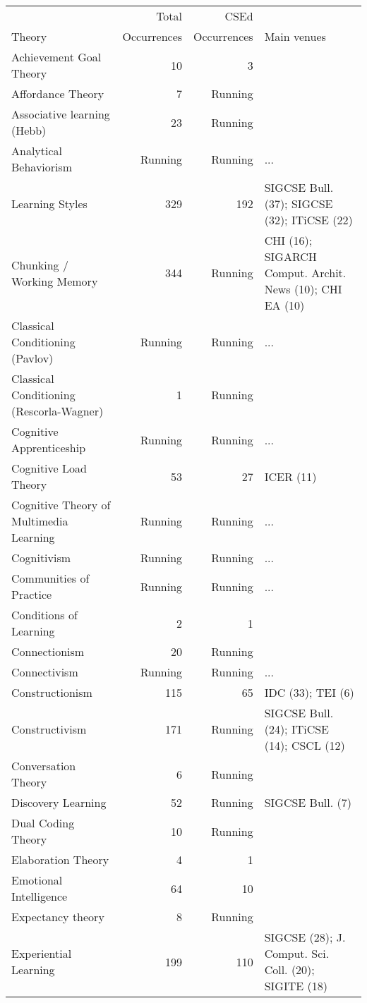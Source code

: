 \begin{table*}[t]
\begin{tabular}{lrrp{6cm}}
& Total & CSEd & \\Theory & Occurrences & Occurrences & Main venues\\\hline
Achievement Goal Theory & 10 & 3 &  \\
Affordance Theory & 7 & Running &  \\
Associative learning (Hebb) & 23 & Running &  \\
Analytical Behaviorism & Running & Running & ... \\
Learning Styles & 329 & 192 & SIGCSE Bull. (37); SIGCSE  (32); ITiCSE  (22) \\
Chunking / Working Memory & 344 & Running & CHI  (16); SIGARCH Comput. Archit. News (10); CHI EA  (10) \\
Classical Conditioning (Pavlov) & Running & Running & ... \\
Classical Conditioning (Rescorla-Wagner) & 1 & Running &  \\
Cognitive Apprenticeship & Running & Running & ... \\
Cognitive Load Theory & 53 & 27 & ICER  (11) \\
Cognitive Theory of Multimedia Learning & Running & Running & ... \\
Cognitivism & Running & Running & ... \\
Communities of Practice & Running & Running & ... \\
Conditions of Learning & 2 & 1 &  \\
Connectionism & 20 & Running &  \\
Connectivism & Running & Running & ... \\
Constructionism & 115 & 65 & IDC  (33); TEI  (6) \\
Constructivism & 171 & Running & SIGCSE Bull. (24); ITiCSE  (14); CSCL  (12) \\
Conversation Theory & 6 & Running &  \\
Discovery Learning & 52 & Running & SIGCSE Bull. (7) \\
Dual Coding Theory & 10 & Running &  \\
Elaboration Theory & 4 & 1 &  \\
Emotional Intelligence & 64 & 10 &  \\
Expectancy theory & 8 & Running &  \\
Experiential Learning & 199 & 110 & SIGCSE  (28); J. Comput. Sci. Coll. (20); SIGITE  (18) \\

\end{tabular}
\end{table*}
